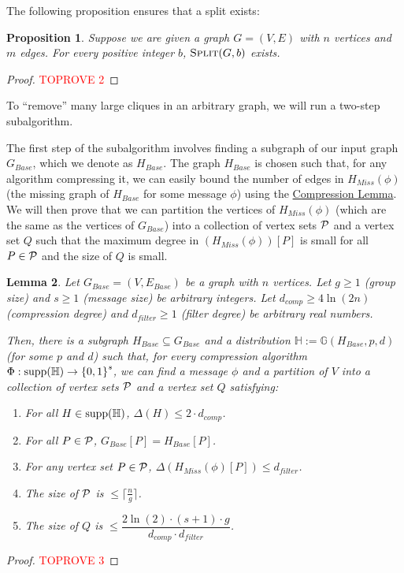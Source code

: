 \documentclass[11pt]{article}
\newtheorem{lemma}{Lemma}[section]
\newtheorem{proposition}[lemma]{Proposition}
\theoremstyle{definition}
\renewcommand{\leq}{\leqslant}
\renewcommand{\geq}{\geqslant}
\renewcommand{\le}{\leq}
\renewcommand{\ge}{\geq}
\newcommand{\supp}[1]{\ensuremath{\textnormal{\text{supp}}(#1)}}
\begin{document}
\noindent
The following proposition ensures that a split exists:

\begin{proposition}\label{partition-degree-bound}
Suppose we are given a graph $G=(V, E)$ with $n$ vertices and $m$ edges. For every positive integer $b$, $\textnormal{\textsc{Split}}(G, b)$ exists.
\end{proposition}
\begin{proof}\textcolor{red}{TOPROVE 2}\end{proof}

To ``remove'' many large cliques in an arbitrary graph, we will run a two-step subalgorithm. 

The first step of the subalgorithm involves finding a subgraph of our input graph $G_{Base}$, which we denote as $H_{Base}$. The graph $H_{Base}$ is chosen such that, for any algorithm compressing it, we can easily bound the number of edges in $H_{Miss}(\phi)$ (the missing graph of $H_{Base}$ for some message $\phi$) using the \hyperref[compression]{Compression Lemma}. We will then prove that we can partition the vertices of $H_{Miss}(\phi)$ (which are the same as the vertices of $G_{Base}$) into a collection of vertex sets $\mathcal{P}$ and a vertex set $Q$ such that the maximum degree in $\left(H_{Miss}(\phi)\right)[P]$ is small for all $P\in \mathcal{P}$ and the size of $Q$ is small. 

\begin{lemma}\label{compressed-partition}
Let $G_{Base}=(V, E_{Base})$ be a graph with $n$ vertices. Let $g\ge 1$ (group size) and $s\ge 1$ (message size) be arbitrary integers. Let $d_{comp}\ge4\ln(2n)$ (compression degree) and $d_{filter}\ge 1$ (filter degree) be arbitrary real numbers.

Then, there is a subgraph $H_{Base}\subseteq G_{Base}$ and a distribution $\mathbb{H}:=\mathbb{G}(H_{Base}, p, d)$ (for some $p$ and $d$) such that, for every compression algorithm $\Phi:\supp{\mathbb{H}}\rightarrow {\{0, 1 \}}^s$, we can find a message $\phi$ and a partition of $V$ into a collection of vertex sets $\mathcal{P}$ and a vertex set $Q$ satisfying:
\begin{enumerate}
    \item\label{H-degree} For all $H\in \supp{\mathbb{H}}$, $\Delta{(H)}\le 2\cdot d_{comp}$.
    \item\label{edge-in} For all $P\in \mathcal{P}$, $G_{Base}[P]=H_{Base}[P]$.
    \item\label{P-condition} For any vertex set $P\in \mathcal{P}$, $\Delta{(H_{Miss}(\phi)[P])}\le d_{filter}$. 
    \item\label{P-size} The size of $\mathcal{P}$ is $\le\lceil\frac ng\rceil$. 
    \item\label{Q-condition} The size of $Q$ is $\le \dfrac{2\ln (2)\cdot (s+1)\cdot g}{d_{comp}\cdot d_{filter}}$.
\end{enumerate}
\end{lemma}
\begin{proof}\textcolor{red}{TOPROVE 3}\end{proof}
\end{document}
